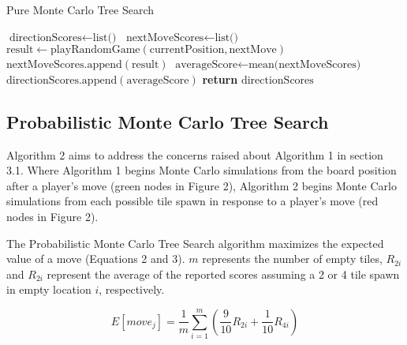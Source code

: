 \documentclass{article}
\begin{document}
\begin{algorithm}
    \caption{Pure Monte Carlo Tree Search}
    \begin{algorithmic}[1]
            \State $\text{directionScores} \gets \text{list()}$
                \State $\text{nextMoveScores} \gets \text{list()}$
                    \State $\text{result} \gets \text{playRandomGame}(\text{currentPosition}, \text{nextMove})$
                    \State $\text{nextMoveScores}.\text{append}(\text{result})$
                \EndFor
                \State $\text{averageScore} \gets \text{mean(nextMoveScores)}$
                \State $\text{directionScores}.\text{append}(\text{averageScore})$
            \EndFor
            \State \textbf{return} $\text{directionScores}$
        \EndFunction
    \end{algorithmic}
\end{algorithm}

\subsection{Probabilistic Monte Carlo Tree Search}
Algorithm 2 aims to address the concerns raised about Algorithm 1 in section 3.1.  Where Algorithm 1 begins Monte Carlo simulations from the board position after a player's move (green nodes in Figure 2), Algorithm 2 begins Monte Carlo simulations from each possible tile spawn in response to a player's move (red nodes in Figure 2).  

The Probabilistic Monte Carlo Tree Search algorithm maximizes the expected value of a move (Equations 2 and 3). $m$ represents the number of empty tiles, $R_{2i}$ and $R_{2i}$ represent the average of the reported scores assuming a 2 or 4 tile spawn in empty location $i$, respectively.

\begin{equation}
  \label{eq:expected_value}
  E[move_j] = \frac{1}{m}\sum_{i=1}^m \left(\frac{9}{10}R_{2i} + \frac{1}{10}R_{4i}\right)
\end{equation}
\end{document}
